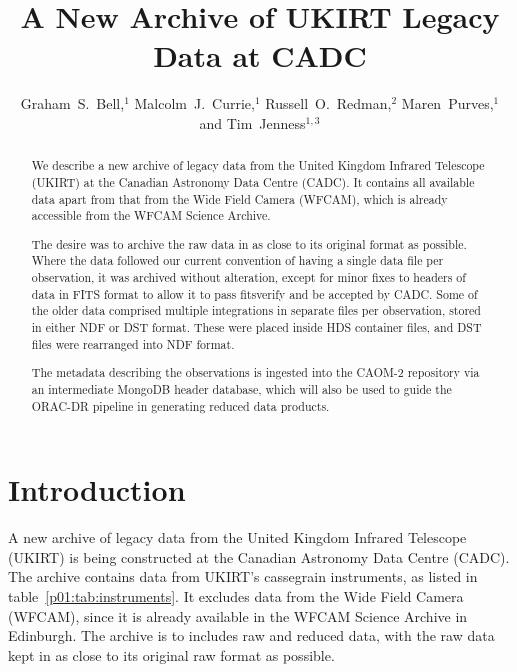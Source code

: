 \documentclass[11pt,twoside]{article}
\begin{document}
\title{A New Archive of UKIRT Legacy Data at CADC}
\author{Graham~S.~Bell,$^1$ Malcolm~J.~Currie,$^1$ Russell~O.~Redman,$^2$ Maren~Purves,$^1$ and Tim~Jenness$^{1,3}$
}

\begin{abstract}
We describe a  new archive of legacy data from the United Kingdom Infrared
Telescope (UKIRT) at the Canadian Astronomy
Data Centre (CADC).  It contains all available data apart from
that from the Wide Field Camera (WFCAM), which is already
accessible from the WFCAM Science Archive.

The desire was to archive the raw data in as close to its original
format as possible.  Where the data followed our current convention
of having a single data file per observation, it was archived
without alteration, except for minor fixes to headers of data in
FITS format to allow it to pass fitsverify and be accepted by CADC.
Some of the older data comprised multiple integrations in separate
files per observation, stored in either NDF or DST format. These
were placed inside HDS container files, and DST files were rearranged
into NDF format.

The metadata describing the observations is
ingested into the CAOM-2 repository via an
intermediate MongoDB header database, which will
also be used to guide the ORAC-DR pipeline
in generating reduced data products.
\end{abstract}

\section{Introduction}

A new archive of legacy data from the United Kingdom Infrared
Telescope (UKIRT) is being constructed at the Canadian Astronomy
Data Centre (CADC).
The archive contains data from UKIRT's cassegrain instruments,
as listed in table~\ref{p01:tab:instruments}.
It excludes data from the Wide Field Camera (WFCAM),
since it is already available in the WFCAM Science Archive
\citep{2008MNRAS.384..637H}
in Edinburgh.
The archive is to includes raw and reduced data,
with the raw data
kept in as close to its original raw format as possible.
\end{document}
